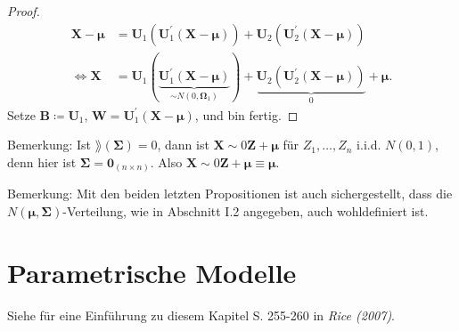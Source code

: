 \documentclass{tstextbook}
\begin{document}
\begin{proof}
	\[
	\begin{aligned}
		\mathbf{X}-\boldsymbol{\mu} & = \mathbf{U}_1\left(\mathbf{U}_1^\prime (\mathbf{X}-\boldsymbol{\mu})\right) + \mathbf{U}_2 \left(\mathbf{U}_2^\prime (\mathbf{X}-\boldsymbol{\mu})\right) \\
		\Leftrightarrow \mathbf{X} & = \mathbf{U}_1(\underbrace{\mathbf{U}_1^\prime (\mathbf{X}-\boldsymbol{\mu})}_{\sim N(0,\mathbf{\Omega}_1)}) + \underbrace{\mathbf{U}_2 \left(\mathbf{U}_2^\prime (\mathbf{X}-\boldsymbol{\mu})\right)}_{0} + \boldsymbol{\mu}.
	\end{aligned}
	\]
	Setze $ \mathbf{B} \coloneqq \mathbf{U}_1 $, $ \mathbf{W} = \mathbf{U}_1^\prime (\mathbf{X}-\boldsymbol{\mu}) $, und bin fertig.
\end{proof}

\begin{remark}
	Bemerkung: Ist $ \rang(\boldsymbol{\Sigma}) = 0 $, dann ist $ \mathbf{X}\sim 0\mathbf{Z}+\boldsymbol{\mu} $ für $ Z_1,\ldots, Z_n $ i.i.d. $ N(0,1) $, denn hier ist $ \boldsymbol{\Sigma} = \boldsymbol{0}_{(n\times n)} $. Also $ \mathbf{X} \sim 0\mathbf{Z} +\boldsymbol{\mu} \equiv \boldsymbol{\mu}. $
\end{remark}	

\begin{remark}
	Bemerkung: Mit den beiden letzten Propositionen ist auch sichergestellt, dass die $ N(\boldsymbol{\mu}, \boldsymbol{\Sigma}) $-Verteilung, wie in Abschnitt I.2 angegeben, auch wohldefiniert ist.
\end{remark}





\chapter{Parametrische Modelle}

\begin{book}
	Siehe für eine Einführung zu diesem Kapitel S. 255-260 in \textit{Rice (2007)}.
\end{book}
\end{document}

